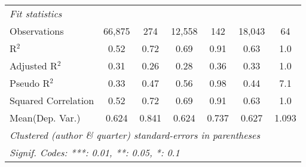 \begin{tabular}{lcccccc}
   \midrule
   \emph{Fit statistics}\\
   Observations                                               & 66,875        & 274           & 12,558        & 142         & 18,043         & 64\\  
   R$^2$                                                      & 0.52          & 0.72          & 0.69          & 0.91        & 0.63           & 1.0\\  
   Adjusted R$^2$                                             & 0.31          & 0.26          & 0.28          & 0.36        & 0.33           & 1.0\\  
   Pseudo R$^2$                                               & 0.33          & 0.47          & 0.56          & 0.98        & 0.44           & 7.1\\  
   Squared Correlation                                        & 0.52          & 0.72          & 0.69          & 0.91        & 0.63           & 1.0\\  
Mean(Dep. Var.) & 0.624 & 0.841 & 0.624 & 0.737 & 0.627 & 1.093 \\
   \midrule \midrule
   \multicolumn{7}{l}{\emph{Clustered (author \& quarter) standard-errors in parentheses}}\\
   \multicolumn{7}{l}{\emph{Signif. Codes: ***: 0.01, **: 0.05, *: 0.1}}\\
\end{tabular}
\par\endgroup
